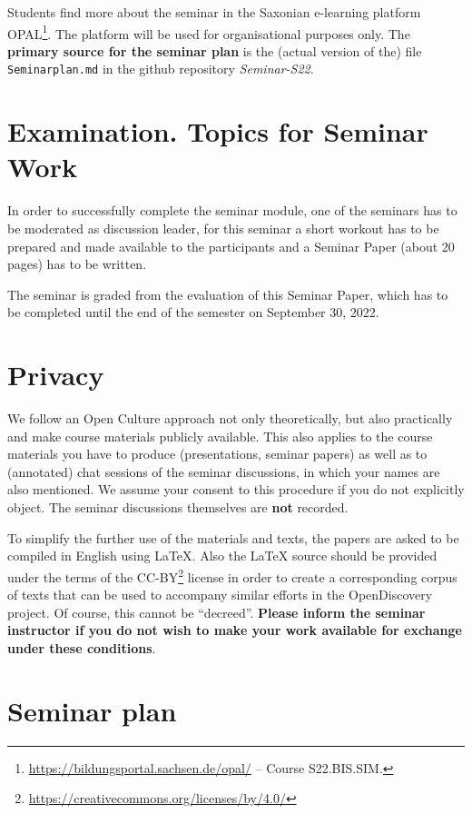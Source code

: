 \documentclass[11pt,a4paper]{article}
\begin{document}
Students find more about the seminar in the Saxonian e-learning platform
OPAL\footnote{\url{https://bildungsportal.sachsen.de/opal/} -- Course
  S22.BIS.SIM.}.  The platform will be used for organisational purposes only.
The \textbf{primary source for the seminar plan} is the (actual version of
the) file \texttt{Seminarplan.md} in the github repository \emph{Seminar-S22}.

\section{Examination. Topics for Seminar Work}

In order to successfully complete the seminar module, one of the seminars has
to be moderated as discussion leader, for this seminar a short workout has to
be prepared and made available to the participants and a Seminar Paper (about
20 pages) has to be written.

The seminar is graded from the evaluation of this Seminar Paper, which has to
be completed until the end of the semester on September 30, 2022.

\section{Privacy}

We follow an Open Culture approach not only theoretically, but also
practically and make course materials publicly available.  This also applies
to the course materials you have to produce (presentations, seminar papers) as
well as to (annotated) chat sessions of the seminar discussions, in which your
names are also mentioned.  We assume your consent to this procedure if you do
not explicitly object.  The seminar discussions themselves are \textbf{not}
recorded.

To simplify the further use of the materials and texts, the papers are asked
to be compiled in English using {\LaTeX}.  Also the {\LaTeX} source should be
provided under the terms of the
CC-BY\footnote{\url{https://creativecommons.org/licenses/by/4.0/}} license in
order to create a corresponding corpus of texts that can be used to accompany
similar efforts in the OpenDiscovery project. Of course, this cannot be
\enquote{decreed}. \textbf{Please inform the seminar instructor if you do not
  wish to make your work available for exchange under these conditions}.

\section{Seminar plan}
\end{document}
